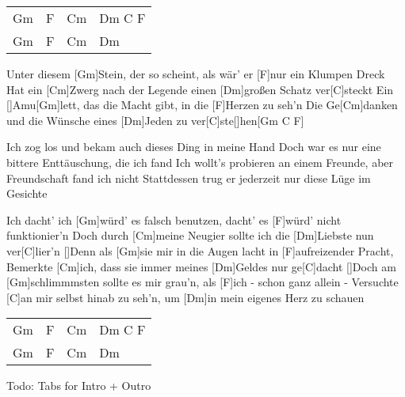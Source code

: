 

\begin{guitar}
	{\footnotesize\begin{tabular}{l|l|l|l}
			Gm & F & Cm & Dm C F \\
			Gm & F & Cm & Dm 
	\end{tabular}}
	
	Unter diesem [Gm]Stein, der so scheint, als wär' er [F]nur ein Klumpen Dreck
	Hat ein [Cm]Zwerg nach der Legende einen [Dm]großen Schatz ver[C]steckt
	Ein []Amu[Gm]lett, das die Macht gibt, in die [F]Herzen zu seh'n
	Die Ge[Cm]danken und die Wünsche eines [Dm]Jeden zu ver[C]ste[]hen[Gm C F]{}
	
	Ich zog los und bekam auch dieses Ding in meine Hand
	Doch war es nur eine bittere Enttäuschung, die ich fand
	Ich wollt's probieren an einem Freunde, aber Freundschaft fand ich nicht
	Stattdessen trug er jederzeit nur diese Lüge im Gesichte
	
	Ich dacht' ich [Gm]würd' es falsch benutzen, dacht' es [F]würd' nicht funktionier'n
	Doch durch [Cm]meine Neugier sollte ich die [Dm]Liebste nun ver[C]lier'n
	[]Denn als [Gm]sie mir in die Augen lacht in [F]aufreizender Pracht,
	Bemerkte [Cm]ich, dass sie immer meines [Dm]Geldes nur ge[C]dacht
	[]Doch am [Gm]schlimmmsten sollte es mir grau'n, als [F]ich - schon ganz allein -
	Versuchte [C]an mir selbst hinab zu seh'n, um [Dm]in mein eigenes Herz zu schauen
	
	{\footnotesize\begin{tabular}{l|l|l|l}
			Gm & F & Cm & Dm C F \\
			Gm & F & Cm & Dm 
	\end{tabular}}
\end{guitar}

{\color{gray}Todo: Tabs for Intro + Outro}
